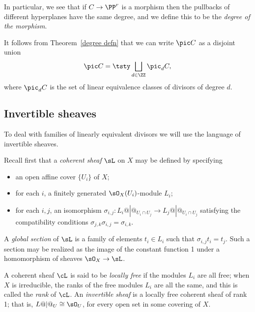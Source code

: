 In particular, we see that if $C\to \PP^{r}$ is a morphism then
the pullbacks of different hyperplanes
have the same degree, and we define this to be the 
\emph{degree of the morphism}.
%

It follows from Theorem~\ref{degree defn} that we can write $\pic C$ as a disjoint union
$$
\pic C = \tsty\bigsqcup\limits_{d \in \ZZ} \pic_d C,
$$
where $\pic_d C$ is the set of linear equivalence classes of divisors of degree $d$.

\subsection*{Invertible sheaves}%

To deal with families of linearly equivalent divisors we will use the language of invertible sheaves. 
%

Recall first that a \emph{coherent sheaf} $\sL$ on $X$ may be defined by
%
specifying
\begin{itemize}
 \item an open affine cover $\{U_{i}\}$ of $X$; 
 \item for each $i$, a finitely generated $\sO_{X}(U_{i})$-module $L_{i}$;
 \item for each $i,j$, an isomorphism $\sigma_{i,j}: L_{i}@|@_{U_{i}\cap U_{j}} \to L_{j}@|@_{U_{i}\cap U_{j}}$
 satisfying the compatibility conditions $\sigma_{j,k}\sigma_{i,j} = \sigma_{i,k}$. 
 \end{itemize}

A 
\emph{global section}
%
of $\sL$ is a family of elements $t_{i}\in L_{i}$ such that 
$\sigma_{i,j} t_{i} = t_{j}$. Such a section may be realized as the image of the constant function 1 under
a homomorphism of sheaves $\sO_{X} \to \sL$. 

A coherent sheaf $\cL$ is said to be 
\emph{locally free}
%
if the modules $L_i$ are all free; when $X$ is irreducible, the ranks
of the free modules $L_{i}$ are all the same, and this is called the
\emph{rank}
%
of $\cL$.
An 
\emph{invertible sheaf}
%
is a locally free coherent sheaf of rank 1;  that is, $L@|@_U \cong \sO_U$,
for every open set in some covering of $X$. 

